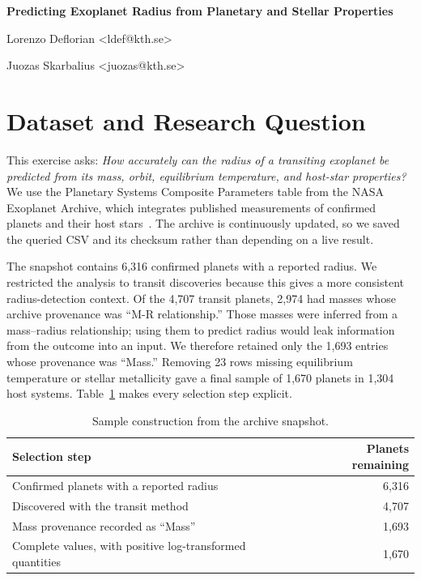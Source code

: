 \documentclass[11pt,a4paper]{article}
\newcommand{\unnumberedheading}[1]{%
  \par\vspace{2pt}{\fontsize{14}{16.5}\selectfont\bfseries #1\par}\vspace{6pt}%
}
\newcommand{\reporttitle}[1]{%
  {\fontsize{16}{19}\selectfont\bfseries #1\par}\vspace{12pt}%
}
\begin{document}
\reporttitle{Predicting Exoplanet Radius from Planetary and Stellar Properties}
\unnumberedheading{Authors}
Lorenzo Deflorian <ldef@kth.se>\par
Juozas Skarbalius <juozas@kth.se>\par

\section{Dataset and Research Question}

This exercise asks: \emph{How accurately can the radius of a transiting exoplanet be predicted from its mass, orbit, equilibrium temperature, and host-star properties?} We use the Planetary Systems Composite Parameters table from the NASA Exoplanet Archive, which integrates published measurements of confirmed planets and their host stars~\cite{akeson2013archive,nasaarchive2026}. The archive is continuously updated, so we saved the queried CSV and its checksum rather than depending on a live result.

The snapshot contains 6,316 confirmed planets with a reported radius. We restricted the analysis to transit discoveries because this gives a more consistent radius-detection context. Of the 4,707 transit planets, 2,974 had masses whose archive provenance was ``M-R relationship.'' Those masses were inferred from a mass--radius relationship; using them to predict radius would leak information from the outcome into an input. We therefore retained only the 1,693 entries whose provenance was ``Mass.'' Removing 23 rows missing equilibrium temperature or stellar metallicity gave a final sample of 1,670 planets in 1,304 host systems. Table~\ref{tab:selection} makes every selection step explicit.

\begin{table}[tbp]
  \centering
  \small
  \begin{tabular}{>{\raggedright\arraybackslash}p{7.9cm}r}
    \toprule
    Selection step & Planets remaining \\
    \midrule
    Confirmed planets with a reported radius & 6,316 \\
    Discovered with the transit method & 4,707 \\
    Mass provenance recorded as ``Mass'' & 1,693 \\
    Complete values, with positive log-transformed quantities & 1,670 \\
    \bottomrule
  \end{tabular}
  \caption{Sample construction from the archive snapshot.}
  \label{tab:selection}
\end{table}
\end{document}
